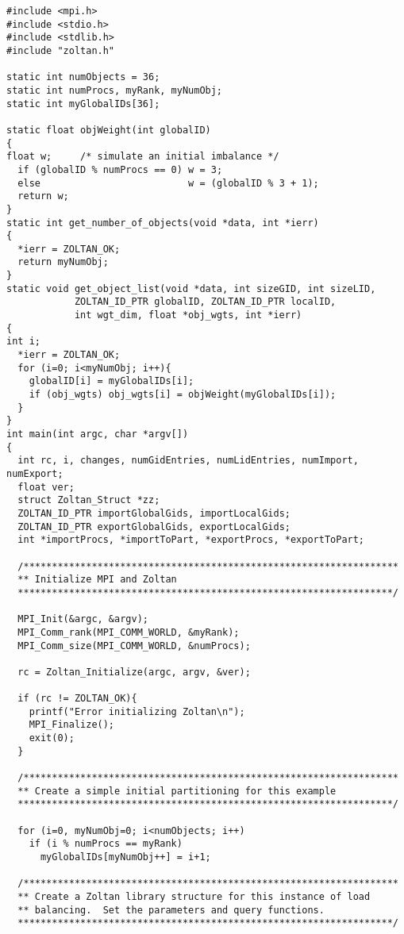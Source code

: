 \begin{flushleft}
\begin{verbatim}
#include <mpi.h>
#include <stdio.h>
#include <stdlib.h>
#include "zoltan.h"

static int numObjects = 36;
static int numProcs, myRank, myNumObj;
static int myGlobalIDs[36];

static float objWeight(int globalID)
{
float w;     /* simulate an initial imbalance */
  if (globalID % numProcs == 0) w = 3;
  else                          w = (globalID % 3 + 1);
  return w;
}
static int get_number_of_objects(void *data, int *ierr)
{
  *ierr = ZOLTAN_OK;
  return myNumObj;
}
static void get_object_list(void *data, int sizeGID, int sizeLID,
            ZOLTAN_ID_PTR globalID, ZOLTAN_ID_PTR localID,
            int wgt_dim, float *obj_wgts, int *ierr)
{
int i;
  *ierr = ZOLTAN_OK;
  for (i=0; i<myNumObj; i++){
    globalID[i] = myGlobalIDs[i];
    if (obj_wgts) obj_wgts[i] = objWeight(myGlobalIDs[i]);
  }
}
int main(int argc, char *argv[])
{
  int rc, i, changes, numGidEntries, numLidEntries, numImport, numExport;
  float ver;
  struct Zoltan_Struct *zz;
  ZOLTAN_ID_PTR importGlobalGids, importLocalGids;
  ZOLTAN_ID_PTR exportGlobalGids, exportLocalGids; 
  int *importProcs, *importToPart, *exportProcs, *exportToPart;

  /******************************************************************
  ** Initialize MPI and Zoltan
  ******************************************************************/

  MPI_Init(&argc, &argv);
  MPI_Comm_rank(MPI_COMM_WORLD, &myRank);
  MPI_Comm_size(MPI_COMM_WORLD, &numProcs);

  rc = Zoltan_Initialize(argc, argv, &ver);

  if (rc != ZOLTAN_OK){
    printf("Error initializing Zoltan\n");
    MPI_Finalize();
    exit(0);
  }

  /******************************************************************
  ** Create a simple initial partitioning for this example
  ******************************************************************/

  for (i=0, myNumObj=0; i<numObjects; i++)
    if (i % numProcs == myRank)
      myGlobalIDs[myNumObj++] = i+1;

  /******************************************************************
  ** Create a Zoltan library structure for this instance of load
  ** balancing.  Set the parameters and query functions.
  ******************************************************************/


\end{verbatim}
\end{flushleft}
